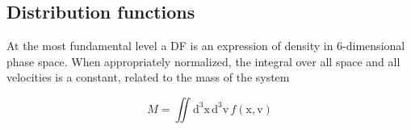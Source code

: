 \subsection{Distribution functions}

At the most fundamental level a DF is an expression of density in 6-dimensional phase space. When appropriately normalized, the integral over all space and all velocities is a constant, related to the mass of the system

\begin{equation}
    M = \iint \mathrm{d}^3\mathbf{\mathrm{x}}\, \mathrm{d}^3\mathbf{\mathrm{v}}\, f( \mathbf{\mathrm{x}}, \mathbf{\mathrm{v}} )
\end{equation}